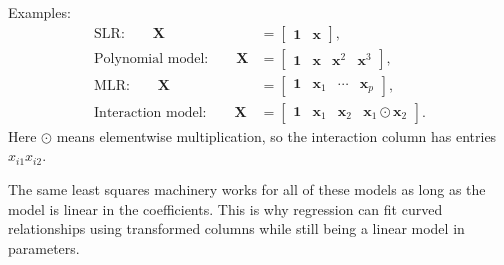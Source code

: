 Examples:
\begin{align}
  \text{SLR:}\qquad
  \mathbf{X} &= \begin{bmatrix}\mathbf{1}&\mathbf{x}\end{bmatrix}, \\
  \text{Polynomial model:}\qquad
  \mathbf{X} &= \begin{bmatrix}\mathbf{1}&\mathbf{x}&\mathbf{x}^2&\mathbf{x}^3\end{bmatrix}, \\
  \text{MLR:}\qquad
  \mathbf{X} &= \begin{bmatrix}\mathbf{1}&\mathbf{x}_1&\cdots&\mathbf{x}_p\end{bmatrix}, \\
  \text{Interaction model:}\qquad
  \mathbf{X} &= \begin{bmatrix}\mathbf{1}&\mathbf{x}_1&\mathbf{x}_2&\mathbf{x}_1\odot\mathbf{x}_2\end{bmatrix}.
\end{align}
Here \(\odot\) means elementwise multiplication, so the interaction column has entries \(x_{i1}x_{i2}\).

The same least squares machinery works for all of these models as long as the model is linear in the coefficients.  This is why regression can fit curved relationships using transformed columns while still being a linear model in parameters.

